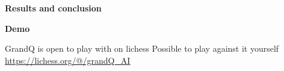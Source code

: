 \documentclass[compress]{beamer}
\newcommand{\slidetitle}[1]{\textbf{\Large{#1}}\vspace{5mm}}
\begin{document}
\begin{frame}
    \slidetitle{Results and conclusion}
\end{frame}

\begin{frame}
    \slidetitle{Demo}
    \begin{outline}
        \1 GrandQ is open to play with on lichess
            \2 Possible to play against it yourself
        \1 \underline{\href{https://lichess.org/@/grandQ_AI}{https://lichess.org/@/grandQ\_AI}}
    \end{outline}
\end{frame}
\end{document}
